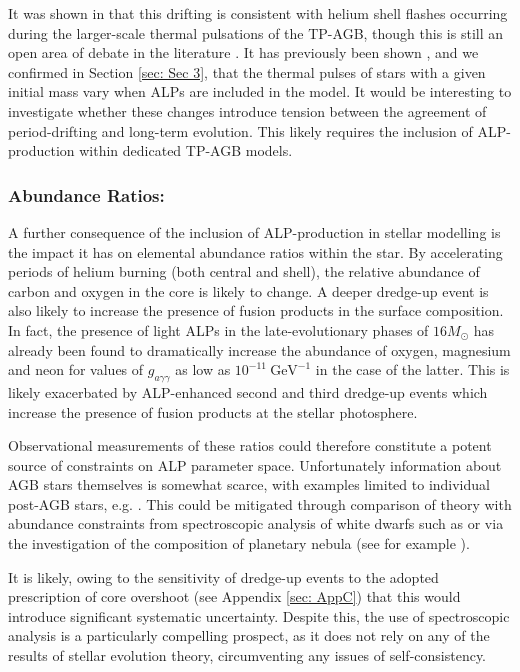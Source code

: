 It was shown in \cite{WoodMiras1981} that this drifting is consistent with helium shell flashes occurring during the larger-scale thermal pulsations of the TP-AGB, though this is still an open area of debate in the literature \cite{NeilsonMiraPeriodChange}. It has previously been shown \cite{Dominguez}, and we confirmed in Section \ref{sec: Sec 3}, that the thermal pulses of stars with a given initial mass vary when ALPs are included in the model. It would be interesting to investigate whether these changes introduce tension between the agreement of period-drifting and long-term evolution. This likely requires the inclusion of ALP-production within dedicated TP-AGB models.



\subsubsection*{Abundance Ratios:}
A further consequence of the inclusion of ALP-production in stellar modelling is the impact it has on elemental abundance ratios within the star. By accelerating periods of helium burning (both central and shell), the relative abundance of carbon and oxygen in the core is likely to change. A deeper dredge-up event is also likely to increase the presence of fusion products in the surface composition. In fact, the presence of light ALPs in the late-evolutionary phases of $16M_{\odot}$ has already been found to dramatically increase the abundance of oxygen, magnesium and neon for values of $g_{a\gamma\gamma}$ as low as $10^{-11}~\mathrm{GeV}^{-1}$ \cite{Aoyama:2015asa} in the case of the latter. This is likely exacerbated by ALP-enhanced second and third dredge-up events which increase the presence of fusion products at the stellar photosphere.



Observational measurements of these ratios could therefore constitute a potent source of constraints on ALP parameter space. Unfortunately information about AGB stars themselves is somewhat scarce, with examples limited to individual post-AGB stars, e.g. \cite{PostAGBSpec}. This could be mitigated through comparison of theory with abundance constraints from spectroscopic analysis of white dwarfs such as \cite{Coutu_2019} or via the investigation of the composition of planetary nebula (see for example \cite{PlanNebAGB, karakas_lattanzio_2003}).


It is likely, owing to the sensitivity of dredge-up events to the adopted prescription of core overshoot (see Appendix \ref{sec: AppC}) that this would introduce significant systematic uncertainty. Despite this, the use of spectroscopic analysis is a particularly compelling prospect, as it does not rely on any of the results of stellar evolution theory, circumventing any issues of self-consistency.